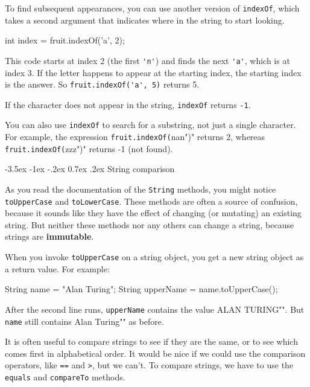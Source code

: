 \documentclass[12pt]{book}
\makeatletter
\theoremstyle{exercise}
\newcommand{\java}[1]{\verb"#1"}
\renewcommand{\section}{\@startsection{section}{1}{\z@}%
    {-3.5ex \@plus -1ex \@minus -.2ex}%
    {0.7ex \@plus.2ex}%
    {\normalfont\Large\bfseries}}
\newcommand{\java}[1]{\lstinline{#1}} %
\makeatother
\begin{document}
To find subsequent appearances, you can use another version of \java{indexOf}, which takes a second argument that indicates where in the string to start looking.

\begin{code}
    int index = fruit.indexOf('a', 2);
\end{code}

This code starts at index 2 (the first \java{'n'}) and finds the next \java{'a'}, which is at index 3.
If the letter happens to appear at the starting index, the starting index is the answer.
So \java{fruit.indexOf('a', 5)} returns 5.

If the character does not appear in the string, \java{indexOf} returns \java{-1}.

You can also use \java{indexOf} to search for a substring, not just a single character.
For example, the expression \java{fruit.indexOf("nan")} returns 2, whereas \java{fruit.indexOf("zzz")} returns -1 (not found).


\section{String comparison}
\label{immutable}
\label{incomparable}


As you read the documentation of the \java{String} methods, you might notice \java{toUpperCase} and \java{toLowerCase}.
These methods are often a source of confusion, because it sounds like they have the effect of changing (or mutating) an existing string.
But neither these methods nor any others can change a string, because strings are {\bf immutable}.

When you invoke \java{toUpperCase} on a string object, you get a new string object as a return value.
For example:

\begin{code}
    String name = "Alan Turing";
    String upperName = name.toUpperCase();
\end{code}


After the second line runs, \java{upperName} contains the value \java{"ALAN TURING"}.
But \java{name} still contains \java{"Alan Turing"} as before.


It is often useful to compare strings to see if they are the same, or to see which comes first in alphabetical order.
It would be nice if we could use the comparison operators, like \java{==} and \java{>}, but we can't.
To compare strings, we have to use the \java{equals} and \java{compareTo} methods.
\end{document}
